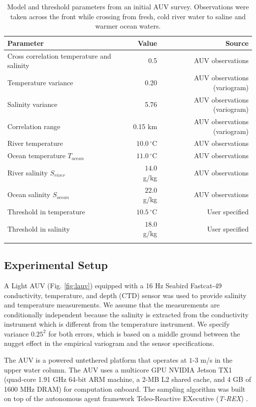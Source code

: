 \documentclass[aoas]{imsart}
\begin{document}
\begin{table}[!h]
\centering
\begin{tabular}{lrr}
\toprule
Parameter & Value & Source\\
\midrule
\rowcolor{Gray}
Cross correlation temperature and salinity & 0.5 & AUV observations\\
Temperature variance &  0.20 & AUV observations (variogram)\\
\rowcolor{Gray}
Salinity variance &  5.76 & AUV observations (variogram)\\
Correlation range  & 0.15 km & AUV observations (variogram)\\
\rowcolor{Gray}
River temperature  & $10.0\,^{\circ}\mathrm{C}$ & AUV observations\\
Ocean temperature $T_{ocean}$ & $11.0\,^{\circ}\mathrm{C}$ & AUV observations\\
\rowcolor{Gray}
River salinity $S_{river}$ & $14.0$ g/kg & AUV observations\\
Ocean salinity $S_{ocean}$ & $22.0$ g/kg & AUV observations\\
\rowcolor{Gray}
Threshold in temperature & $10.5\,^{\circ}\mathrm{C}$ & User specified \\
Threshold in salinity & $18.0$ g/kg & User specified \\
\rowcolor{Gray}
\bottomrule
\end{tabular}
\caption{Model and threshold parameters from an initial AUV
  survey. Observations were taken across the front while crossing from
  fresh, cold river water to saline and warmer ocean waters.}
\label{tab:experiment_param}
\end{table}


\subsection{Experimental Setup}

A Light AUV \citep{sousa2012lauv}
(Fig. \ref{fig:lauv}) equipped with a 16 Hz Seabird Fastcat-49
conductivity, temperature, and depth (CTD) sensor was used to provide
salinity and temperature measurements. We assume that the measurements are conditionally independent because the salinity is extracted from the conductivity instrument which is different from the temperature instrument. We specify variance $0.25^2$ for both errors, which is based on a middle ground between the nugget effect in the empirical variogram and the sensor specifications.

The AUV is a powered untethered platform that
operates at $1$-$3$ m/s in the upper water column. The AUV uses a multicore GPU NVIDIA
Jetson TX1 (quad-core 1.91 GHz 64-bit ARM machine, a 2-MB L2 shared
cache, and 4 GB of 1600 MHz DRAM) for computation onboard.
The sampling algorithm was built on top of the autonomous agent framework
Teleo-Reactive EXecutive (\textit{T-REX})
\citep{py10,Rajan12,Rajan12b}.
\end{document}
